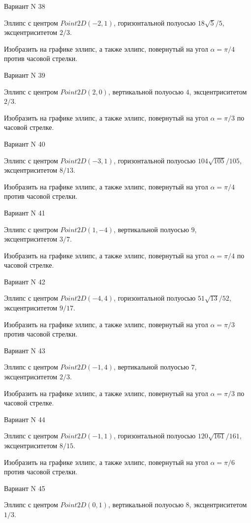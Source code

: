 \documentclass[11pt]{report}
\begin{document}
Вариант N 38

Эллипс с центром $Point2D\left(-2, 1\right)$, горизонтальной полуосью $18 \sqrt{5} / 5$, эксцентриситетом $2 / 3$.

    Изобразить на графике эллипс, а также эллипс, повернутый на угол $\alpha = $$\pi / 4$ против часовой стрелки.

Вариант N 39

Эллипс с центром $Point2D\left(2, 0\right)$, вертикальной полуосью $4$, эксцентриситетом $2 / 3$.

    Изобразить на графике эллипс, а также эллипс, повернутый на угол $\alpha = $$\pi / 3$ по часовой стрелке.

Вариант N 40

Эллипс с центром $Point2D\left(-3, 1\right)$, горизонтальной полуосью $104 \sqrt{105} / 105$, эксцентриситетом $8 / 13$.

    Изобразить на графике эллипс, а также эллипс, повернутый на угол $\alpha = $$\pi / 4$ против часовой стрелки.

Вариант N 41

Эллипс с центром $Point2D\left(1, -4\right)$, вертикальной полуосью $9$, эксцентриситетом $3 / 7$.

    Изобразить на графике эллипс, а также эллипс, повернутый на угол $\alpha = $$\pi / 4$ по часовой стрелке.

Вариант N 42

Эллипс с центром $Point2D\left(-4, 4\right)$, горизонтальной полуосью $51 \sqrt{13} / 52$, эксцентриситетом $9 / 17$.

    Изобразить на графике эллипс, а также эллипс, повернутый на угол $\alpha = $$\pi / 3$ против часовой стрелки.

Вариант N 43

Эллипс с центром $Point2D\left(-1, 4\right)$, вертикальной полуосью $7$, эксцентриситетом $2 / 3$.

    Изобразить на графике эллипс, а также эллипс, повернутый на угол $\alpha = $$\pi / 3$ по часовой стрелке.

Вариант N 44

Эллипс с центром $Point2D\left(-1, 1\right)$, горизонтальной полуосью $120 \sqrt{161} / 161$, эксцентриситетом $8 / 15$.

    Изобразить на графике эллипс, а также эллипс, повернутый на угол $\alpha = $$\pi / 6$ против часовой стрелки.

Вариант N 45

Эллипс с центром $Point2D\left(0, 1\right)$, вертикальной полуосью $8$, эксцентриситетом $1 / 3$.
\end{document}
